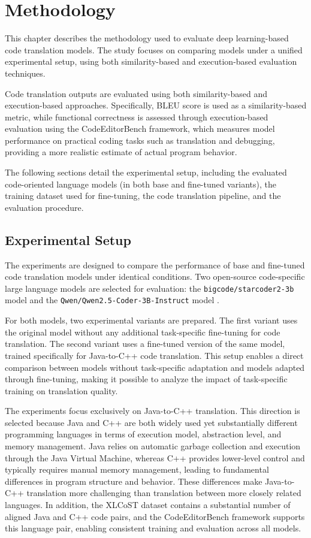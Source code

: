 \chapter{Methodology}

This chapter describes the methodology used to evaluate deep learning-based code translation models. The study focuses
on comparing models under a unified experimental setup, using both
similarity-based and execution-based evaluation techniques.

Code translation outputs are evaluated using both similarity-based and
execution-based approaches. Specifically, BLEU \cite{bleu_metric} score is used as a
similarity-based metric, while functional correctness is assessed through
execution-based evaluation using the CodeEditorBench \cite{codeeditorbench} framework, which measures
model performance on practical coding tasks such as translation and debugging,
providing a more realistic estimate of actual program behavior.

The following sections detail the experimental setup, including the evaluated
code-oriented language models (in both base and fine-tuned variants), the
training dataset used for fine-tuning, the code translation pipeline, and the
evaluation procedure.

\section{Experimental Setup}

The experiments are designed to compare the performance of base and fine-tuned
code translation models under identical conditions. Two open-source
code-specific large language models are selected for evaluation: the
\texttt{bigcode/starcoder2-3b} model \cite{starcoder2} and the
\texttt{Qwen/Qwen2.5-Coder-3B-Instruct} model \cite{qwen_coder}.

For both models, two experimental variants are prepared. The first
variant uses the original model without any additional task-specific
fine-tuning for code translation. The second variant uses a
fine-tuned version of the same model, trained specifically for Java-to-C++ code
translation. This setup enables a direct comparison between models without task-specific adaptation and
models adapted through fine-tuning, making it possible to analyze the impact
of task-specific training on translation quality.

The experiments focus exclusively on Java-to-C++ translation. This direction is
selected because Java and C++ are both widely used yet substantially different
programming languages in terms of execution model, abstraction level, and memory
management. Java relies on automatic garbage collection and execution through
the Java Virtual Machine, whereas C++ provides lower-level control and typically
requires manual memory management, leading to fundamental differences in program
structure and behavior. These differences make
Java-to-C++ translation more challenging than translation between more closely
related languages. In addition, the XLCoST dataset contains a substantial number
of aligned Java and C++ code pairs, and the CodeEditorBench framework supports
this language pair, enabling consistent training and evaluation across all
models.

